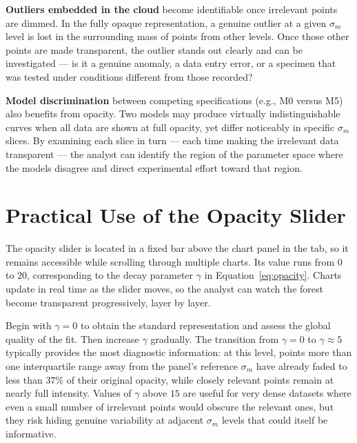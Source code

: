 \textbf{Outliers embedded in the cloud} become identifiable once irrelevant points are dimmed. In the fully opaque representation, a genuine outlier at a given $\sigma_m$ level is lost in the surrounding mass of points from other levels. Once those other points are made transparent, the outlier stands out clearly and can be investigated — is it a genuine anomaly, a data entry error, or a specimen that was tested under conditions different from those recorded?

\textbf{Model discrimination} between competing specifications (e.g., M0 versus M5) also benefits from opacity. Two models may produce virtually indistinguishable curves when all data are shown at full opacity, yet differ noticeably in specific $\sigma_m$ slices. By examining each slice in turn — each time making the irrelevant data transparent — the analyst can identify the region of the parameter space where the models disagree and direct experimental effort toward that region.

\section{Practical Use of the Opacity Slider}

The opacity slider is located in a fixed bar above the chart panel in the  tab, so it remains accessible while scrolling through multiple charts. Its value runs from 0 to 20, corresponding to the decay parameter $\gamma$ in Equation~\eqref{eq:opacity}. Charts update in real time as the slider moves, so the analyst can watch the forest become transparent progressively, layer by layer.

\begin{importantbox}
  Begin with $\gamma = 0$ to obtain the standard representation and assess the global quality of the fit. Then increase $\gamma$ gradually. The transition from $\gamma = 0$ to $\gamma \approx 5$ typically provides the most diagnostic information: at this level, points more than one interquartile range away from the panel's reference $\sigma_m$ have already faded to less than $37\%$ of their original opacity, while closely relevant points remain at nearly full intensity. Values of $\gamma$ above $15$ are useful for very dense datasets where even a small number of irrelevant points would obscure the relevant ones, but they risk hiding genuine variability at adjacent $\sigma_m$ levels that could itself be informative.
\end{importantbox}

